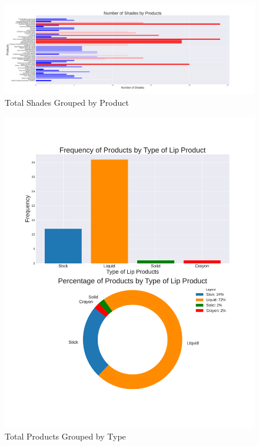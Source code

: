 \documentclass{article}
\begin{document}
\begin{center}
    \begin{landscape}
        \begin{figure}[htbp]
            \centering
            \includegraphics[scale=0.49]{../images/Indonesia-graphs/TotalShadesByProduct.pdf}
            \caption{Total Shades Grouped by Product}
            \label{Shades_by_Product}
        \end{figure}
    \end{landscape}

    \begin{figure}[htbp]
        \centering
        \includegraphics[scale=0.6]{../images/Indonesia-graphs/TotalProductsbyType.pdf}
        \caption{Total Products Grouped by Type}
        \label{Products_by_Type}
    \end{figure}


\end{center}
\end{document}
